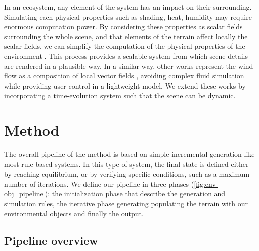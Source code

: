 In an ecosystem, any element of the system has an impact on their surrounding. Simulating each physical properties such as shading, heat, humidity may require enormous computation power. By considering these properties as scalar fields surrounding the whole scene, and that elements of the terrain affect locally the scalar fields, we can simplify the computation of the physical properties of the environment \cite{Grosbellet2016, Guerin2016a}. This process provides a scalable system from which scene details are rendered in a plausible way. In a similar way, other works represent the wind flow as a composition of local vector fields \cite{Wejchert1991}, avoiding complex fluid simulation while providing user control in a lightweight model. We extend these works by incorporating a time-evolution system such that the scene can be dynamic.


\section{Method}
\label{sec:env-obj_method}
The overall pipeline of the method is based on simple incremental generation like most rule-based systems. In this type of system, the final state is defined either by reaching equilibrium, or by verifying specific conditions, such as a maximum number of iterations. 
We define our pipeline in three phases (\cref{fig:env-obj_pipeline}): the initialization phase that describe the generation and simulation rules, the iterative phase generating populating the terrain with our environmental objects and finally the output.


\subsection{Pipeline overview}
\label{sec:env-obj_pipeline}

